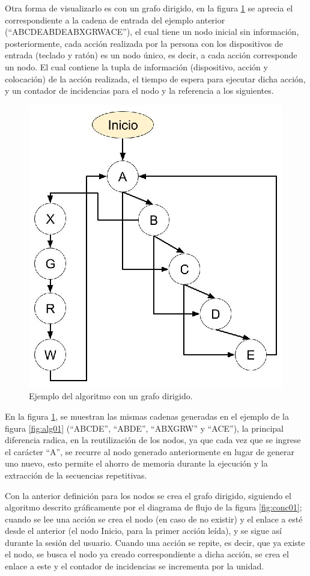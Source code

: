 
Otra forma de visualizarlo es con un grafo dirigido, en la figura
 \ref{fig:alg02} se aprecia el correspondiente a la cadena
 de entrada del ejemplo anterior (``ABCDEABDEABXGRWACE''), el cual tiene un 
 nodo inicial sin informaci\'on, posteriormente, cada acci\'on realizada por 
 la persona con los dispositivos de entrada (teclado y rat\'on) es un nodo
 \'unico, es decir, a cada acci\'on corresponde un nodo. El cual contiene la 
 tupla de informaci\'on (dispositivo,
 acci\'on y colocaci\'on) de la acci\'on realizada, el tiempo de espera para
 ejecutar dicha acci\'on, y un contador de incidencias para el nodo y la
 referencia a los siguientes.
 
 
\begin{figure}[h!]
\centering
\includegraphics[width=0.5\columnwidth]{chap4/Imagenes/algoritmo2.eps}
\caption{Ejemplo del algoritmo con un grafo dirigido.}
\label{fig:alg02}
\end{figure} 
 
\newpage

En la figura \ref{fig:alg02}, se muestran las mismas cadenas generadas en el 
 ejemplo de la figura \ref{fig:alg01} (``ABCDE'', ``ABDE'', ``ABXGRW'' y 
 ``ACE''), la principal diferencia radica, en la reutilizaci\'on de los nodos, 
 ya que cada vez que se ingrese el car\'acter ``A'', se recurre al nodo 
 generado anteriormente en lugar de generar uno nuevo, esto permite el ahorro 
 de memoria durante la ejecuci\'on y la extracci\'on de la secuencias 
 repetitivas.


Con la anterior definici\'on para los nodos se crea el grafo dirigido,
 siguiendo el algoritmo descrito gr\'aficamente por el diagrama de flujo 
 de la figura \ref{fig:conc01}; cuando se lee una acci\'on se crea el nodo
 (en caso de no existir) y el enlace a est\'e desde el anterior (el nodo
 Inicio, para la primer acci\'on le\'ida), y se sigue as\'i durante la sesi\'on
 del usuario. Cuando una acci\'on se repite, es decir, que ya existe el nodo,
 se busca el nodo ya creado correspondiente a dicha acci\'on, se crea el enlace 
 a este y el contador de incidencias se incrementa por la unidad.

